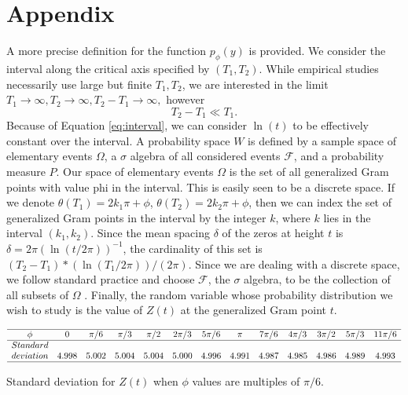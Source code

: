 \documentclass[twoside]{article}
\begin{document}
\section*{\label{appendix} Appendix}

A more precise definition for the function $p_{\phi}(y)$ is provided. We consider the interval along the critical axis specified by $(T_1, T_2)$. While empirical studies necessarily use large but finite  $T_1, T_2$, we are interested in the limit 
$T_1 \rightarrow \infty, T_2 \rightarrow \infty,  T_2-T_1 \rightarrow \infty,$ however
\begin{equation}
T_2 - T_1  \ll T_1. 
\label{eq:interval}
\end{equation}
Because of Equation \ref{eq:interval}, we can consider  $\ln (t)$  to be effectively constant over  the interval. A probability space $W$ is defined by a sample space of elementary events $\Omega$, a $\sigma$ algebra of all considered events $\mathcal{F}$, and a probability measure $P$. Our space of elementary events $\Omega$ is the set of all generalized Gram points with value phi in the interval. This is easily seen to be a discrete space. If we denote $\theta (T_1) = 2k_1\pi + \phi$, $\theta (T_2) = 2k_2\pi + \phi$, then we can index the set of generalized Gram points in the interval by the integer  $k$, where $k$ lies in the interval $(k_1, k_2)$. Since the mean spacing $\delta$ of the zeros at height $t$ is $\delta = 2\pi(\ln (t/2\pi))^{-1}$, the cardinality of this set is $(T_2 - T_1)*(\ln (T_1/2\pi))/(2\pi)$. Since we are dealing with a discrete space, we follow standard practice and choose $\mathcal{F}$,  the  $\sigma$ algebra, to be the collection of all subsets of $\Omega$ . Finally, the random variable whose probability distribution we wish to study is the value of $Z(t)$ at the generalized Gram point $t$.

\begin{table}
\centering \(\begin{array}{ccccccccccccc}
\hline
\phi & 0& \pi/6 &  \pi/3 &  \pi/2 & 2 \pi/3 & 5\pi/6 & \pi & 7\pi/6 & 4\pi/3 & 3\pi/2 & 5\pi/3 & 11\pi/6 \\
\hline
Standard& \\
deviation & 4.998& 5.002& 5.004& 5.004& 5.000& 4.996& 4.991& 4.987& 4.985& 4.986& 4.989& 4.993\\
\hline
\end{array}\)
\caption{Standard deviation for  $Z(t)$ when $\phi$ values are multiples of $\pi/6$.}
\label{tab:stddev6}
\end{table}
\end{document}

